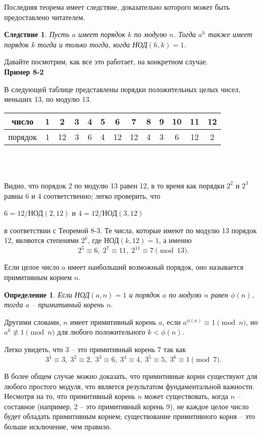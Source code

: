 \documentclass[11pt]{article}
\newtheorem{definition}{Определение}
\newtheorem{corollary}{Следствие}
\begin{document}
Последняя теорема имеет следствие, доказательно которого может быть предоставлено читателем.

\begin{corollary}
	\it Пусть $a$ имеет порядок $k$ по модулю $n$. Тогда $a^h$ также имеет порядок $k$ тогда и только тогда, когда НОД$(h,k)=1$.
\end{corollary}

Давайте посмотрим, как все это работает, на конкретном случае.\\

\textbf{Пример 8-2}

В следующей таблице представлены порядки положительных целых чисел, меньших 13, по модулю 13.\\

\begin{tabular}{c|c c c c c c c c c c c c}
    число &1 &2 &3 &4 &5 &6 &7 &8 &9 &10 &11 &12\\
    \hline
    порядок &1 &12 &3 &6 &4 &12 &12 &4 &3 &6 &12 &2
\end{tabular}\\\\
\newpage
\thispagestyle{fancyOdd}

Видно, что порядок 2 по модулю 13 равен 12, в то время как порядки $2^2$ и $2^3$ равны 6 и 4 соответственно; легко проверить, что
\begin{center}
    $6=12/$НОД$(2,12)$ и $4=12/$НОД$(3,12)$
\end{center}
в соответствии с Теоремой 8-3. Те числа, которые имеют по модулю 13 порядок 12, являются степенями $2^k$, где НОД$(k,12)=1$, а именно $$2^5\equiv6,\;2^7\equiv11,\;2^{11}\equiv7\pmod{13}.$$

Если целое число $a$ имеет наибольший возможный порядок, оно называется примитивным корнем $n$.

\begin{definition}
	Если НОД$(a,n)=1$ и порядок $a$ по модулю $n$ равен $\phi(n)$, тогда $a$ -- \emph{примитивный корень} $n.$
\end{definition}

Другими словами, $n$ имеет примитивный корень $a$, если $a^{\phi(n)}\equiv1\pmod{n}$, но $a^k\not\equiv1\pmod{n}$ для любого положительного $k<\phi(n)$.

Легко увидеть, что 3 -- это примитивный корень 7 так как $$3^1\equiv3,\; 3^2\equiv2,\; 3^3\equiv6,\; 3^4\equiv4,\; 3^5\equiv5,\; 3^6\equiv1\pmod{7}.$$

В более общем случае можно доказать, что примитивные корни существуют для любого простого модуля, что является результатом фундаментальной важности. Несмотря на то, что примитивный корень $n$ может существовать, когда $n$ -- составное (например, 2 -- это примитивный корень 9), не каждое целое число будет обладать примитивным корнем; существование примитивного корня -- это больше исключение, чем правило.\\
\end{document}
